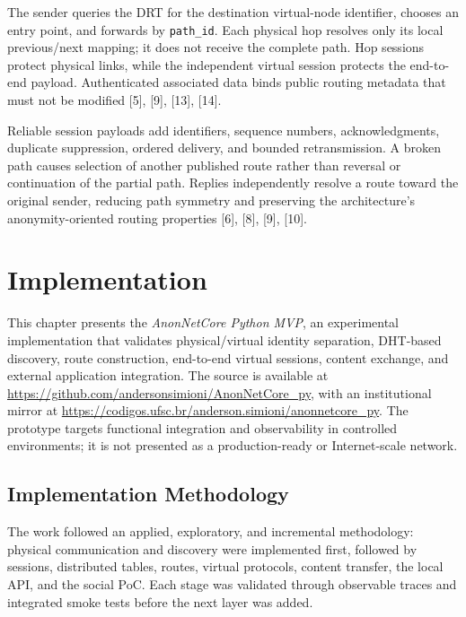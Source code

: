 \documentclass[12pt,a4paper]{article}
\begin{document}
\thesisdeliverytikz

The sender queries the DRT for the destination virtual-node identifier, chooses an
entry point, and forwards by \texttt{path\_id}. Each physical hop resolves only its
local previous/next mapping; it does not receive the complete path. Hop sessions
protect physical links, while the independent virtual session protects the end-to-end
payload. Authenticated associated data binds public routing metadata that must not be
modified [5], [9], [13], [14].

Reliable session payloads add identifiers, sequence numbers, acknowledgments,
duplicate suppression, ordered delivery, and bounded retransmission. A broken path
causes selection of another published route rather than reversal or continuation of
the partial path. Replies independently resolve a route toward the original sender,
reducing path symmetry and preserving the architecture's anonymity-oriented routing
properties [6], [8], [9], [10].












\clearpage
\section{Implementation}

This chapter presents the \textit{AnonNetCore Python MVP}, an experimental implementation that validates physical/virtual identity separation, DHT-based discovery, route construction, end-to-end virtual sessions, content exchange, and external application integration. The source is available at \url{https://github.com/andersonsimioni/AnonNetCore_py}, with an institutional mirror at \url{https://codigos.ufsc.br/anderson.simioni/anonnetcore_py}. The prototype targets functional integration and observability in controlled environments; it is not presented as a production-ready or Internet-scale network.

\subsection{Implementation Methodology}
\label{sec:implementation-methodology}

The work followed an applied, exploratory, and incremental methodology: physical communication and discovery were implemented first, followed by sessions, distributed tables, routes, virtual protocols, content transfer, the local API, and the social PoC. Each stage was validated through observable traces and integrated smoke tests before the next layer was added.
\end{document}
